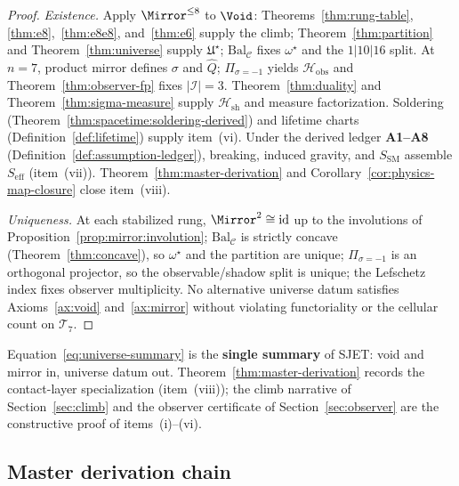 \begin{proof}
\emph{Existence.}
Apply $\Mirror^{\leq 8}$ to $\Void$: Theorems~\ref{thm:rung-table},
\ref{thm:e8},~\ref{thm:e8e8}, and~\ref{thm:e6} supply the climb;
Theorem~\ref{thm:partition} and Theorem~\ref{thm:universe} supply
$\mathfrak{U}^\star$; $\mathrm{Bal}_{\mathcal{C}}$ fixes $\omega^\star$ and
the $1|10|16$ split. At $n=7$, product mirror defines $\sigma$ and
$\hat Q$; $\Pi_{\sigma=-1}$ yields $\mathcal{H}_{\mathrm{obs}}$ and
Theorem~\ref{thm:observer-fp} fixes $|\mathcal{I}|=3$. Theorem~\ref{thm:duality}
and Theorem~\ref{thm:sigma-measure} supply $\mathcal{H}_{\mathrm{sh}}$ and
measure factorization. Soldering (Theorem~\ref{thm:spacetime:soldering-derived})
and lifetime charts (Definition~\ref{def:lifetime}) supply item~(vi). Under
the derived ledger \textbf{A1--A8}
(Definition~\ref{def:assumption-ledger}), breaking, induced gravity, and
$S_{\mathrm{SM}}$ assemble $S_{\mathrm{eff}}$ (item~(vii)). Theorem~\ref{thm:master-derivation}
and Corollary~\ref{cor:physics-map-closure} close item~(viii).

\emph{Uniqueness.}
At each stabilized rung, $\Mirror^2\cong\mathrm{id}$ up to the involutions of
Proposition~\ref{prop:mirror:involution}; $\mathrm{Bal}_{\mathcal{C}}$ is
strictly concave (Theorem~\ref{thm:concave}), so $\omega^\star$ and the
partition are unique; $\Pi_{\sigma=-1}$ is an orthogonal projector, so the
observable/shadow split is unique; the Lefschetz index fixes observer
multiplicity. No alternative universe datum satisfies Axioms~\ref{ax:void}
and~\ref{ax:mirror} without violating functoriality or the cellular count on
$\mathcal{T}_7$.
\end{proof}

\begin{remark}
Equation~\eqref{eq:universe-summary} is the \textbf{single summary} of SJET:
void and mirror in, universe datum out. Theorem~\ref{thm:master-derivation}
records the contact-layer specialization (item~(viii)); the climb narrative of
Section~\ref{sec:climb} and the observer certificate of
Section~\ref{sec:observer} are the constructive proof of items~(i)--(vi).
\end{remark}

\subsection{Master derivation chain}

